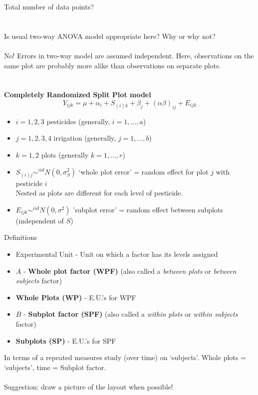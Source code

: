 Total number of data points?\\~\\~\\
Is usual two-way ANOVA model appropriate here?  Why or why not?\\~\\
No! Errors in two-way model are assumed independent.  Here, observations on the same plot are probably more alike than observations on separate plots. \\~\\~\\
\textbf{Completely Randomized Split Plot model}
$$Y_{ijk}=\mu+\alpha_i+S_{(i)k}+\beta_{j}+(\alpha\beta)_{ij}+E_{ijk}$$
\begin{itemize}
\item $i=1,2,3$ pesticides (generally, $i=1,...,a$)
\item $j=1,2,3,4$ irrigation (generally, $j=1,...,b$)
\item $k=1,2$ plots (generally $k=1,...,r$)
\item $S_{(i)j}\sim^{iid}N(0,\sigma^2_S)$ `whole plot error' = random effect for plot $j$ with pesticide $i$\\
Nested as plots are different for each level of pesticide.
\item $E_{ijk}\sim^{iid}N(0,\sigma^2)$ 'subplot error' = random effect between subplots  (independent of $S$)
\end{itemize}

\newpage

Definitions
\begin{itemize}
\item Experimental Unit - Unit on which a factor has its levels assigned
\item $A$ - \textbf{Whole plot factor (WPF)} (also called a {\em between plots} or {\em between subjects}  factor)
\item \textbf{Whole Plots (WP)} - E.U.'s for WPF
\item $B$ - \textbf{Subplot factor (SPF)} (also called a {\em within plots} or {\em within subjects} factor)
\item \textbf{Subplots (SP)} - E.U.'s for SPF
\end{itemize}
In terms of a repeated measures study (over time) on `subjects'.  Whole plots = `subjects', time = Subplot factor.\\~\\

Suggestion: draw a picture of the layout when possible!\\~\\~\\~\\~\\~\\~\\~\\~\\

